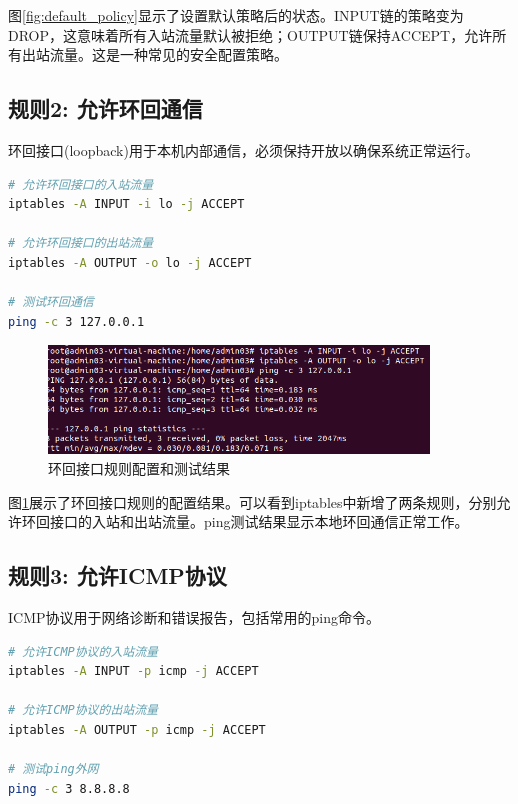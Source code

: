 \documentclass[12pt,a4paper]{article}
\begin{document}
图\ref{fig:default_policy}显示了设置默认策略后的状态。INPUT链的策略变为DROP，这意味着所有入站流量默认被拒绝；OUTPUT链保持ACCEPT，允许所有出站流量。这是一种常见的安全配置策略。

\subsection{规则2: 允许环回通信}

环回接口(loopback)用于本机内部通信，必须保持开放以确保系统正常运行。

\begin{lstlisting}[language=bash, caption=配置环回接口规则]
# 允许环回接口的入站流量
iptables -A INPUT -i lo -j ACCEPT

# 允许环回接口的出站流量
iptables -A OUTPUT -o lo -j ACCEPT

# 测试环回通信
ping -c 3 127.0.0.1
\end{lstlisting}

\begin{figure}[H]
    \centering
    \includegraphics[width=0.9\textwidth]{04_loopback_rule.png}
    \caption{环回接口规则配置和测试结果}
    \label{fig:loopback_rule}
\end{figure}

图\ref{fig:loopback_rule}展示了环回接口规则的配置结果。可以看到iptables中新增了两条规则，分别允许环回接口的入站和出站流量。ping测试结果显示本地环回通信正常工作。

\subsection{规则3: 允许ICMP协议}

ICMP协议用于网络诊断和错误报告，包括常用的ping命令。

\begin{lstlisting}[language=bash, caption=配置ICMP协议规则]
# 允许ICMP协议的入站流量
iptables -A INPUT -p icmp -j ACCEPT

# 允许ICMP协议的出站流量
iptables -A OUTPUT -p icmp -j ACCEPT

# 测试ping外网
ping -c 3 8.8.8.8
\end{lstlisting}
\end{document}
